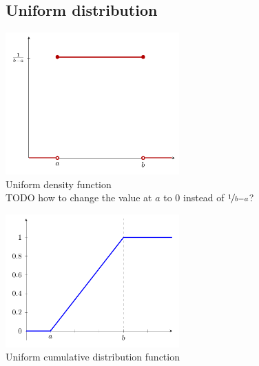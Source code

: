 \documentclass[a4paper]{article}
\begin{document}
	\subsection{Uniform  distribution}		
		\begin{multicols}{2}
		\centering
		\includegraphics[width=0.5\textwidth]{uniform_density}\\
		Uniform density function\\TODO how to change the value at $a$ to 0 instead of $\nicefrac{1}{b-a}$?
		\columnbreak
		
		\includegraphics[width=0.5\textwidth]{uniform_distribution_CDF}\\
		Uniform cumulative distribution function
		\end{multicols}
		
\end{document}
